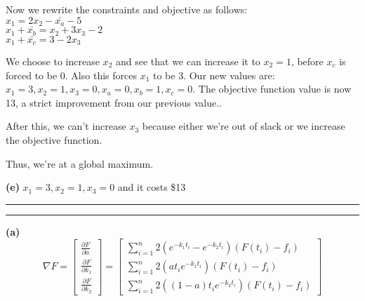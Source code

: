 \documentclass[11pt,letterpaper]{article}
\newcommand{\question}[1] {\vspace{.25in} \hrule\vspace{0.5em}
\noindent{\bf #1} \vspace{0.5em}
\hrule \vspace{.10in}}
\renewcommand{\part}[1] {\vspace{.10in} {\bf (#1)}}
\begin{document}
Now we rewrite the constraints and objective as follows:\\
$x_1 = 2x_2 - \bar{x_a} - 5$\\
$x_1 + \bar{x_b} = x_2 + 3x_3  - 2$\\
$x_1 + \bar{x_c} = 3 - 2x_3$

We choose to increase $x_2$ and see that we can increase it to $x_2 = 1$, before $x_c$ is forced to be 0.
Also this forces $x_1$ to be 3. Our new values are: $x_1 = 3, x_2 = 1, x_3 = 0, x_a = 0, x_b = 1, x_c = 0$.
The objective function value is now 13, a strict improvement from our previous value..

After this, we can't increase $x_3$ because either we're out of slack or we increase the objective function.

Thus, we're at a global maximum.

\part{e}
$x_1 = 3, x_2 = 1, x_3 = 0$ and it costs \$13


\question{4}

\part{a}
$$\nabla F = \begin{bmatrix}
\frac{\partial F}{\partial a}\\
\frac{\partial F}{\partial k_1}\\
\frac{\partial F}{\partial k_2}
\end{bmatrix}
=
\begin{bmatrix}
\sum_{i=1}^{n} 2(e^{-k_{1}t_i} - e^{-k_{2}t_i})(F(t_i) - f_i)\\
\sum_{i=1}^{n} 2(at_{i}e^{-k_{1}t_i})(F(t_i) - f_i)\\
\sum_{i=1}^{n} 2((1-a)t_{i}e^{-k_{2}t_i})(F(t_i) - f_i)
\end{bmatrix}$$
\end{document}
